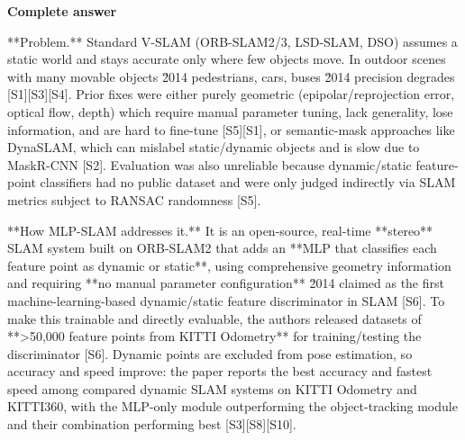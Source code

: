 \documentclass[10pt]{article}
\begin{document}
\textbf{Complete answer}
\begin{AnswerText}
**Problem.** Standard V-SLAM (ORB-SLAM2/3, LSD-SLAM, DSO) assumes a static world and stays accurate only where few objects move. In outdoor scenes with many movable objects \u2014 pedestrians, cars, buses \u2014 precision degrades [S1][S3][S4]. Prior fixes were either purely geometric (epipolar/reprojection error, optical flow, depth) which require manual parameter tuning, lack generality, lose information, and are hard to fine-tune [S5][S1], or semantic-mask approaches like DynaSLAM, which can mislabel static/dynamic objects and is slow due to MaskR-CNN [S2]. Evaluation was also unreliable because dynamic/static feature-point classifiers had no public dataset and were only judged indirectly via SLAM metrics subject to RANSAC randomness [S5].

**How MLP-SLAM addresses it.** It is an open-source, real-time **stereo** SLAM system built on ORB-SLAM2 that adds an **MLP that classifies each feature point as dynamic or static**, using comprehensive geometry information and requiring **no manual parameter configuration** \u2014 claimed as the first machine-learning-based dynamic/static feature discriminator in SLAM [S6]. To make this trainable and directly evaluable, the authors released datasets of **>50,000 feature points from KITTI Odometry** for training/testing the discriminator [S6]. Dynamic points are excluded from pose estimation, so accuracy and speed improve: the paper reports the best accuracy and fastest speed among compared dynamic SLAM systems on KITTI Odometry and KITTI360, with the MLP-only module outperforming the object-tracking module and their combination performing best [S3][S8][S10].
\end{AnswerText}
\end{document}
